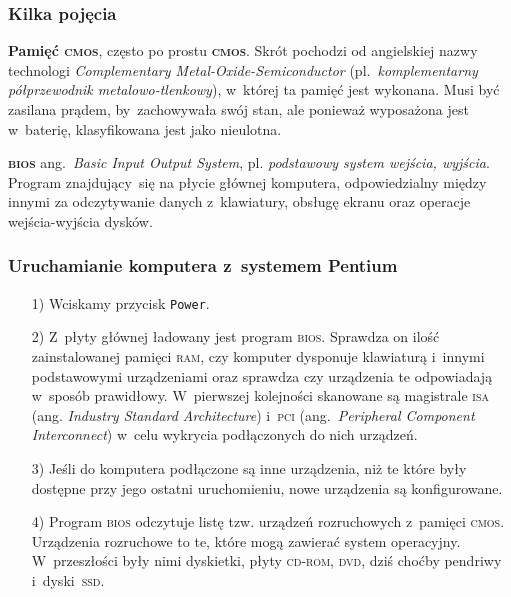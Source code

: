\documentclass[10pt,t]{beamer}
\begin{document}
\begin{frame}
  \frametitle{Kilka pojęcia}


  \textbf{Pamięć \textsc{cmos}}, często po prostu \textbf{\textsc{cmos}}.
  Skrót pochodzi od angielskiej nazwy technologi \textit{Complementary
    Metal-Oxide-Semiconductor} (pl.~\textit{komplementarny półprzewodnik
    metalowo-tlenkowy}), w~której ta pamięć jest wykonana. Musi być zasilana
  prądem, by~zachowywała swój stan, ale ponieważ wyposażona jest w~baterię,
  klasyfikowana jest jako nieulotna.

  \textbf{\textsc{bios}} ang.~\textit{Basic Input Output System}, pl.
  \textit{podstawowy system wejścia, wyjścia}. Program znajdujący~się
  na płycie głównej komputera, odpowiedzialny między innymi za odczytywanie
  danych z~klawiatury, obsługę ekranu oraz operacje wejścia-wyjścia dysków.

\end{frame}





\begin{frame}
  \frametitle{Uruchamianie komputera z~systemem Pentium}


  \begin{itemize}

  \item[1)] Wciskamy przycisk \texttt{Power}.

  \item[2)] Z~płyty głównej ładowany jest program \textsc{bios}. Sprawdza on
    ilość zainstalowanej pamięci \textsc{ram}, czy komputer dysponuje
    klawiaturą i~innymi podstawowymi urządzeniami oraz sprawdza czy
    urządzenia te odpowiadają w~sposób prawidłowy. W~pierwszej
    kolejności skanowane są magistrale \textsc{isa}
    (ang. \textit{Industry Standard Architecture}) i~\textsc{pci}
    (ang.~\textit{Peripheral Component Interconnect}) w~celu wykrycia
    podłączonych do nich urządzeń.

  \item[3)] Jeśli do komputera podłączone są inne urządzenia, niż te które
    były dostępne przy jego ostatni uruchomieniu, nowe urządzenia są
    konfigurowane.

  \item[4)] Program \textsc{bios} odczytuje listę tzw. urządzeń rozruchowych
    z~pamięci \textsc{cmos}. Urządzenia rozruchowe to te, które mogą
    zawierać system operacyjny. W~przeszłości były nimi dyskietki, płyty
    \textsc{cd}-\textsc{rom}, \textsc{dvd}, dziś choćby pendriwy
    i~dyski~\textsc{ssd}.

  \end{itemize}

\end{frame}
\end{document}
